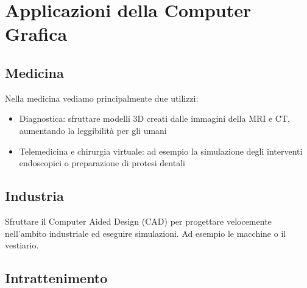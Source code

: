 \newpage

\section{Applicazioni della Computer Grafica}
\subsection{Medicina}
Nella medicina vediamo principalmente due utilizzi:
\begin{itemize}
	\item Diagnostica: sfruttare modelli 3D creati dalle immagini della MRI e CT, aumentando la leggibilità per gli umani
	\item Telemedicina e chirurgia virtuale: ad esempio la simulazione degli interventi endoscopici o preparazione di protesi dentali
\end{itemize}
\subsection{Industria}
Sfruttare il Computer Aided Design (CAD) per progettare velocemente nell'ambito industriale ed eseguire simulazioni. Ad esempio le macchine o il vestiario.

\subsection{Intrattenimento}

